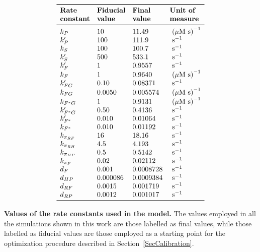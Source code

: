 \documentclass[oneside, 10pt, a4paper, twocolumn]{article}
\begin{document}
\begin{table}[h!]
\[\begin{array}{llll}
\toprule
    \text{\textbf{Rate}} & \text{\textbf{Fiducial}}  & \text{\textbf{Final}} & \text{\textbf{Unit of}}\\
        \text{\textbf{constant}} & \text{\textbf{value}}  & \text{\textbf{value}} & \text{\textbf{measure}}\\
\midrule
    k_P          & 10       & 11.49 & \text{ ($\mu$M s)}^{-1} \\
    k_P'         & 100      & 111.9 & \text{ s}^{-1}         \\
    k_S          & 100      & 100.7 & \text{ s}^{-1}          \\
    k_S'         & 500      & 533.1 & \text{ s}^{-1}          \\
    k_F'         & 1        & 0.9557 & \text{ s}^{-1}          \\
    k_F          & 1        & 0.9640 & \text{ ($\mu$M s)}^{-1} \\
    k_{FG}'      & 0.10     & 0.08371 & \text{ s}^{-1}          \\
    k_{FG}       & 0.0050   & 0.005574 & \text{ ($\mu$M s)}^{-1} \\
    k_{F^*G}     & 1        & 0.9131 & \text{ ($\mu$M s)}^{-1} \\
    k_{F^*G}'    & 0.50     & 0.4136 & \text{ s}^{-1}          \\
    k_{F^*}'     & 0.010    & 0.01064 & \text{ s}^{-1}          \\
    k_{F^*}      & 0.010    &  0.01192 & \text{ s}^{-1}          \\
    k_{\pi_{RF}} & 16       & 18.16 & \text{ s}^{-1}          \\
    k_{\pi_{RH}} & 4.5      & 4.193 & \text{ s}^{-1}          \\
    k_{\pi_{HP}} & 0.5      & 0.5142 & \text{ s}^{-1}          \\
    k_{\pi_F}    & 0.02     & 0.02112 & \text{ s}^{-1}          \\
    d_{F}        & 0.001    & 0.0008728 & \text{ s}^{-1}          \\
    d_{HP}       & 0.000086 & 0.0009384 & \text{ s}^{-1}          \\
    d_{RF}       & 0.0015   & 0.001719 & \text{ s}^{-1}          \\
    d_{RP}       & 0.0012   & 0.001017 & \text{ s}^{-1}          \\
\bottomrule
\end{array}\]
\caption{\textbf{Values of the rate constants used in the model.} The values employed in all the simulations shown in this work are those labelled as final values, while those labelled as fiducial values are those employed as a starting point for the optimization procedure described in Section~\ref{SecCalibration}.}\label{TabKs}
\end{table}
\end{document}
